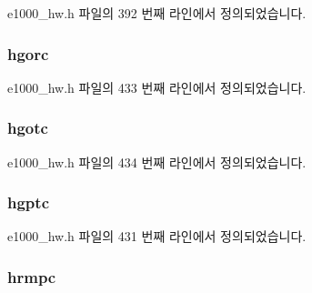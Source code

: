 e1000\+\_\+hw.\+h 파일의 392 번째 라인에서 정의되었습니다.

\subsubsection[{\texorpdfstring{hgorc}{hgorc}}]{ hgorc}\hypertarget{structe1000__hw__stats_ab4be8eeb0926c4dc3a775c29db48f415}{}\label{structe1000__hw__stats_ab4be8eeb0926c4dc3a775c29db48f415}


e1000\+\_\+hw.\+h 파일의 433 번째 라인에서 정의되었습니다.

\subsubsection[{\texorpdfstring{hgotc}{hgotc}}]{ hgotc}\hypertarget{structe1000__hw__stats_afdb170770706ddae0f77f77482409b80}{}\label{structe1000__hw__stats_afdb170770706ddae0f77f77482409b80}


e1000\+\_\+hw.\+h 파일의 434 번째 라인에서 정의되었습니다.

\subsubsection[{\texorpdfstring{hgptc}{hgptc}}]{ hgptc}\hypertarget{structe1000__hw__stats_ae898a84589c883784109b01a01faa98b}{}\label{structe1000__hw__stats_ae898a84589c883784109b01a01faa98b}


e1000\+\_\+hw.\+h 파일의 431 번째 라인에서 정의되었습니다.

\subsubsection[{\texorpdfstring{hrmpc}{hrmpc}}]{ hrmpc}\hypertarget{structe1000__hw__stats_a98d10d16617919c2b4231a03d57cea69}{}\label{structe1000__hw__stats_a98d10d16617919c2b4231a03d57cea69}


